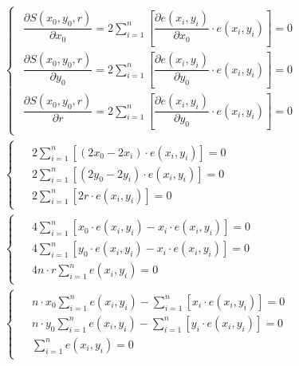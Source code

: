 \begin{align}
    \nonumber
    &\begin{cases}
         \begin{aligned}
             \dfrac{\partial S(x_0, y_0, r)}{\partial x_0} = 2 \sum_{i=1}^{n} \left[
             \dfrac{\partial e(x_i, y_i)}{\partial x_0} \cdot e(x_i, y_i) \right] = 0 \\
             \dfrac{\partial S(x_0, y_0, r)}{\partial y_0} = 2 \sum_{i=1}^{n} \left[
             \dfrac{\partial e(x_i, y_i)}{\partial y_0} \cdot e(x_i, y_i)\right] = 0 \\
             \dfrac{\partial S(x_0, y_0, r)}{\partial r} = 2 \sum_{i=1}^{n} \left[
             \dfrac{\partial e(x_i, y_i)}{\partial y_0} \cdot e(x_i, y_i)\right] = 0
         \end{aligned}
    \end{cases} \\ \nonumber
    &\begin{cases}
         \begin{aligned}
             &2 \sum_{i=1}^{n} \left[ (2 x_0 - 2 x_i) \cdot e(x_i, y_i) \right] = 0 \\
             &2 \sum_{i=1}^{n} \left[ (2 y_0 - 2 y_i) \cdot e(x_i, y_i) \right] = 0 \\
             &2 \sum_{i=1}^{n} \left[ 2 r \cdot e(x_i, y_i) \right] = 0
         \end{aligned}
    \end{cases} \\ \nonumber
    &\begin{cases}
         \begin{aligned}
             &4 \sum_{i=1}^{n} \left[ x_0 \cdot e(x_i, y_i) - x_i \cdot e(x_i, y_i) \right] = 0 \\
             &4 \sum_{i=1}^{n} \left[ y_0 \cdot e(x_i, y_i) - x_i \cdot e(x_i, y_i) \right] = 0 \\
             &4 n \cdot r \sum_{i=1}^{n} e(x_i, y_i) = 0
         \end{aligned}
    \end{cases} \\
    &\begin{cases}
         \label{eq:FindDetail:Circle_MNK_system}
         \begin{aligned}
             &n \cdot x_0 \sum_{i=1}^{n} e(x_i, y_i)
             - \sum_{i=1}^{n} \left[ x_i \cdot e(x_i, y_i) \right] = 0 \\
             &n \cdot y_0 \sum_{i=1}^{n} e(x_i, y_i)
             - \sum_{i=1}^{n} \left[ y_i \cdot e(x_i, y_i) \right] = 0 \\
             &\sum_{i=1}^{n} e(x_i, y_i) = 0
         \end{aligned}
    \end{cases}
\end{align} \\

